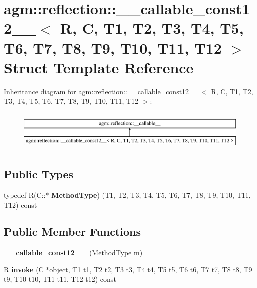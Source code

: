 \hypertarget{structagm_1_1reflection_1_1____callable__const12____}{}\section{agm\+:\+:reflection\+:\+:\+\_\+\+\_\+callable\+\_\+const12\+\_\+\+\_\+$<$ R, C, T1, T2, T3, T4, T5, T6, T7, T8, T9, T10, T11, T12 $>$ Struct Template Reference}
\label{structagm_1_1reflection_1_1____callable__const12____}
Inheritance diagram for agm\+:\+:reflection\+:\+:\+\_\+\+\_\+callable\+\_\+const12\+\_\+\+\_\+$<$ R, C, T1, T2, T3, T4, T5, T6, T7, T8, T9, T10, T11, T12 $>$\+:\begin{figure}[H]
\begin{center}
\leavevmode
\includegraphics[height=1.937716cm]{structagm_1_1reflection_1_1____callable__const12____}
\end{center}
\end{figure}
\subsection*{Public Types}
\begin{DoxyCompactItemize}
\item 
typedef R(C\+::$\ast$ {\bfseries Method\+Type}) (T1, T2, T3, T4, T5, T6, T7, T8, T9, T10, T11, T12) const \hypertarget{structagm_1_1reflection_1_1____callable__const12_____a03947da1a583d085bea84fc1d35822bb}{}\label{structagm_1_1reflection_1_1____callable__const12_____a03947da1a583d085bea84fc1d35822bb}

\end{DoxyCompactItemize}
\subsection*{Public Member Functions}
\begin{DoxyCompactItemize}
\item 
{\bfseries \+\_\+\+\_\+callable\+\_\+const12\+\_\+\+\_\+} (Method\+Type m)\hypertarget{structagm_1_1reflection_1_1____callable__const12_____a771bc4ac01a192adbddbfcbc9854d277}{}\label{structagm_1_1reflection_1_1____callable__const12_____a771bc4ac01a192adbddbfcbc9854d277}

\item 
R {\bfseries invoke} (C $\ast$object, T1 t1, T2 t2, T3 t3, T4 t4, T5 t5, T6 t6, T7 t7, T8 t8, T9 t9, T10 t10, T11 t11, T12 t12) const \hypertarget{structagm_1_1reflection_1_1____callable__const12_____a1aa0399fca9cd9895e32dee5874c8a7a}{}\label{structagm_1_1reflection_1_1____callable__const12_____a1aa0399fca9cd9895e32dee5874c8a7a}

\end{DoxyCompactItemize}
